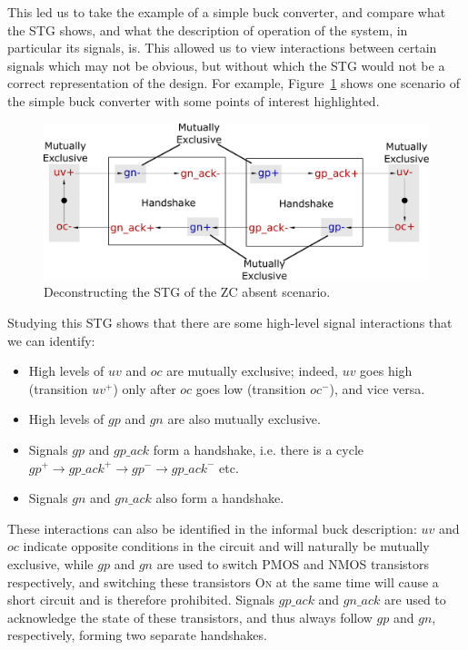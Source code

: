 \documentclass[british,compsoc]{IEEEtran}
\newcommand{\noun}[1]{\textsc{#1}}
\begin{document}
This led us to take the example of a simple buck converter, and compare what
the STG shows, and what the description of operation of the system, in
particular its signals, is. This allowed us to view interactions between
certain signals which may not be obvious, but without which the STG would not
be a correct representation of the design. For example,
Figure~\ref{fig:stg-breakdown} shows one scenario of the simple buck converter
with some points of interest highlighted.

\begin{figure}[t]
\begin{centering}
\includegraphics[scale=0.225]{Images/stg-breakdown}
\par
\protect\caption{\label{fig:stg-breakdown}Deconstructing the STG of the ZC absent scenario.}
\par\end{centering}
\vspace{-4mm}
\end{figure}

Studying this STG shows that there are some high-level signal interactions that
we can identify:
\begin{itemize}
\item High levels of $uv$ and $oc$ are mutually exclusive; indeed, $uv$ goes
high (transition $uv^{+}$) only after $oc$ goes low (transition $oc^{-}$), and vice
versa.
\item High levels of $gp$ and $gn$ are also mutually exclusive.
\item Signals $gp$ and $gp\_ack$ form a handshake, i.e. there is a cycle
$gp^{+} \rightarrow gp\_ack^{+} \rightarrow gp^{-} \rightarrow gp\_ack^{-}$ etc.
\item Signals $gn$ and $gn\_ack$ also form a handshake.
\end{itemize}

These interactions can also be identified in the informal buck description:
$uv$ and $oc$ indicate opposite conditions in the circuit and will naturally be
mutually exclusive, while $gp$ and $gn$ are used to switch PMOS and NMOS
transistors respectively, and switching these transistors \noun{On} at the same
time will cause a short circuit and is therefore prohibited. Signals $gp\_ack$
and $gn\_ack$ are used to acknowledge the state of these transistors, and thus
always follow $gp$ and $gn$, respectively, forming two separate handshakes.
\end{document}
